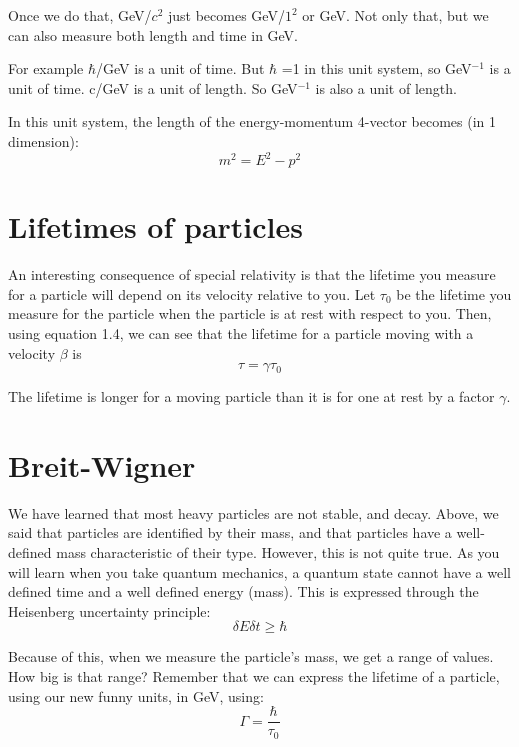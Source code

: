 Once we do that, GeV/$c^2$ just becomes GeV/$1^2$ or GeV. Not only that, but we can also measure both length and time in GeV.

\noindent For example  $\hbar$/GeV is a unit of time.  But $\hbar$ =1 in this unit system, so GeV$^{-1}$ is a unit of time.  c/GeV is a unit of length.  So GeV$^{-1}$ is also a unit of length.


In this unit system, the length of the energy-momentum 4-vector becomes (in 1 dimension):
\begin{equation}
	  m^2 = E^2 - p^2
\end{equation}  	 


\section{Lifetimes of particles}

An interesting consequence of special relativity is that the lifetime you measure for a particle will depend on its velocity relative to you.  Let $\tau _0$  be the lifetime you measure for the particle when the particle is at rest with respect to you.  Then, using equation 1.4, we can see that the lifetime for a particle moving with a velocity $\beta$  is
\begin{equation}
	 \tau  = \gamma \tau _0
\end{equation}  	 

\noindent The lifetime is longer for a moving particle than it is for one at rest by a factor $\gamma$.

\section{Breit-Wigner}

We have learned that most heavy particles are not stable, and decay.  Above, we said that particles are identified by their mass, and that particles have a well-defined mass characteristic of their type.  However, this is not quite true.  As you will learn when you take quantum mechanics, a quantum state cannot have a well defined time and a well defined energy (mass).  This is expressed through the Heisenberg uncertainty principle:
\begin{equation}
	 \delta E \delta t   \ge \hbar
\end{equation} 

\noindent Because of this, when we measure the particle's mass, we get a range of values.  How big is that range?  Remember that we can express the lifetime of a particle, using our new funny units, in GeV, using:
 \begin{equation}
	 \Gamma =   \frac{\hbar}{\tau _0}
\end{equation} 
	  

